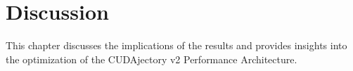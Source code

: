 \chapter{Discussion}
This chapter discusses the implications of the results and provides insights into the optimization of the CUDAjectory v2 Performance Architecture.

